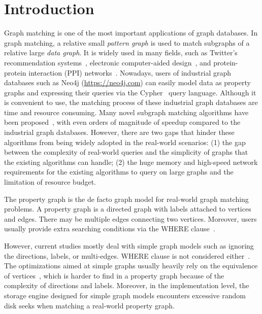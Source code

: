 \section{Introduction}
Graph matching
is one of the most important applications of graph databases. In graph matching, a relative small \emph{pattern graph} is used to match subgraphs of a relative large \emph{data graph}.
It is widely used in many fields,
such as Twitter's recommendation systems~\cite{DBLP:journals/pvldb/GuptaSGGZLL14,DBLP:journals/pvldb/SharmaJBLL16},
electronic computer-aided design~\cite{DBLP:conf/dac/OhlrichEGS93},
and protein-protein interaction (PPI) networks~\cite{milenkovic2008uncovering}.
Nowadays, users of industrial graph databases such as Neo4j (\url{https://neo4j.com})
can easily model data as property graphs and expressing their queries via the Cypher~\cite{DBLP:conf/sigmod/FrancisGGLLMPRS18,DBLP:journals/pvldb/SahuMSLO17} query language.
Although it is convenient to use, the matching process of these industrial graph databases are time and resource consuming.
Many novel subgraph matching algorithms have been proposed~\cite{DBLP:journals/pvldb/SunWWSL12,DBLP:conf/sigmod/HanLL13,DBLP:conf/sigmod/ShaoCCMYX14,DBLP:conf/cloud/SerafiniMS17,DBLP:journals/pvldb/QiaoZC17,DBLP:conf/sigmod/DiasTGM019}, with even orders of magnitude of speedup compared to the industrial graph databases.
However, there are two gaps that hinder these algorithms from being widely adopted in the real-world scenarios:
(1) the gap between the complexity of real-world queries and the simplicity of graphs that the existing algorithms can handle;
(2) the huge memory and high-speed network requirements for the existing algorithms to query on large graphs and the limitation of resource budget.

The property graph is the de facto graph model for real-world graph matching problems.
A property graph is a directed graph with labels attached to vertices and edges.
There may be multiple edges connecting two vertices.
Moreover, users usually provide extra searching conditions via the WHERE clause~\cite{DBLP:journals/csur/AnglesABHRV17}.

However,  current studies mostly deal with simple graph models such as ignoring the directions, labels, or multi-edges. WHERE clause is not considered either~\cite{DBLP:journals/pvldb/SunWWSL12,DBLP:conf/sigmod/HanLL13,DBLP:conf/sigmod/KimLBHLKJ16,DBLP:journals/pvldb/QiaoZC17,DBLP:journals/pvldb/MhedhbiS19}. The optimizations aimed at simple graphs usually heavily rely on the equivalence of vertices~\cite{DBLP:conf/sigmod/HanLL13,DBLP:journals/pvldb/QiaoZC17}, which is harder to find in a property graph because of the complexity of directions and labels. Moreover, in the implementation level, the storage engine designed for simple graph models encounters excessive random disk seeks when matching a real-world property graph.

